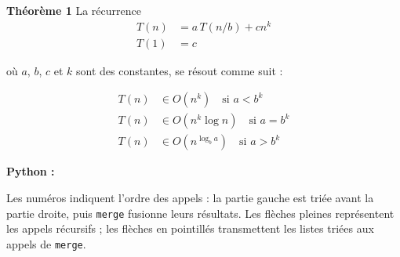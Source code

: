 \begin{Exercice} [30 minutes] [Python]
    \begin{conseil}
\textbf{Théorème 1} \quad La récurrence
\begin{align*}
T(n) &= a\,T(n/b) + c n^{k} \\
T(1) &= c
\end{align*}

où $a$, $b$, $c$ et $k$ sont des constantes, se résout comme suit :

\begin{align*}
T(n) &\in O(n^{k}) \quad \text{si } a < b^{k} \\
T(n) &\in O(n^{k} \log n) \quad \text{si } a = b^{k} \\
T(n) &\in O(n^{\log_{b}{a}}) \quad \text{si } a > b^{k}
\end{align*}

    \end{conseil}
    
    \begin{solution}
        \textbf{Python :}
        
    \end{solution}

    \begin{solution}

    \end{solution}

    \begin{solution}
        \begin{minipage}{\linewidth}
        Les numéros indiquent l'ordre des appels : la partie gauche est triée
        avant la partie droite, puis \texttt{merge} fusionne leurs résultats.
        Les flèches pleines représentent les appels récursifs ; les flèches
        en pointillés transmettent les listes triées aux appels de \texttt{merge}.


\end{minipage}
\end{solution}
\end{Exercice}
